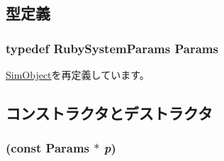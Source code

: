 \subsection{型定義}
\hypertarget{classRubySystem_af3998ceb414058e5e416b8b239698858}{
\subsubsection[{Params}]{\setlength{\rightskip}{0pt plus 5cm}typedef RubySystemParams {\bf Params}}}
\label{classRubySystem_af3998ceb414058e5e416b8b239698858}


\hyperlink{classSimObject_a0f0761d2db586a23bb2a2880b8f387bb}{SimObject}を再定義しています。

\subsection{コンストラクタとデストラクタ}
\hypertarget{classRubySystem_a84ecac2914c133c0db81fe28405e815b}{
\subsubsection[{RubySystem}]{ (const {\bf Params} $\ast$ {\em p})}}
\label{classRubySystem_a84ecac2914c133c0db81fe28405e815b}




